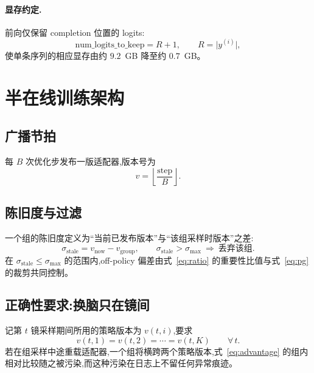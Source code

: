 \documentclass[UTF8, 11pt]{ctexart}
\begin{document}
\paragraph{显存约定.}
前向仅保留 completion 位置的 logits:
\begin{equation}
\text{num\_logits\_to\_keep}=R+1,
\qquad R=\lvert y^{(i)}\rvert,
\label{eq:logitskeep}
\end{equation}
使单条序列的相应显存由约 $9.2$~GB 降至约 $0.7$~GB。

\section{半在线训练架构}

\subsection{广播节拍}

每 $B$ 次优化步发布一版适配器,版本号为
\begin{equation}
v=\left\lfloor \frac{\text{step}}{B} \right\rfloor .
\label{eq:version}
\end{equation}

\subsection{陈旧度与过滤}

一个组的陈旧度定义为“当前已发布版本”与“该组采样时版本”之差:
\begin{equation}
\sigma_{\text{stale}}=v_{\text{now}}-v_{\text{group}},
\qquad
\sigma_{\text{stale}}>\sigma_{\max}\ \Longrightarrow\ \text{丢弃该组}.
\label{eq:staleness}
\end{equation}
在 $\sigma_{\text{stale}}\le\sigma_{\max}$ 的范围内,off-policy 偏差由式~\eqref{eq:ratio} 的重要性比值与式~\eqref{eq:pg} 的裁剪共同控制。

\subsection{正确性要求:换脑只在镜间}

记第 $t$ 镜采样期间所用的策略版本为 $v(t,i)$,要求
\begin{equation}
v(t,1)=v(t,2)=\cdots=v(t,K)
\qquad \forall\, t .
\label{eq:safepoint}
\end{equation}
若在组采样中途重载适配器,一个组将横跨两个策略版本,式~\eqref{eq:advantage} 的组内相对比较随之被污染,而这种污染在日志上不留任何异常痕迹。
\end{document}
